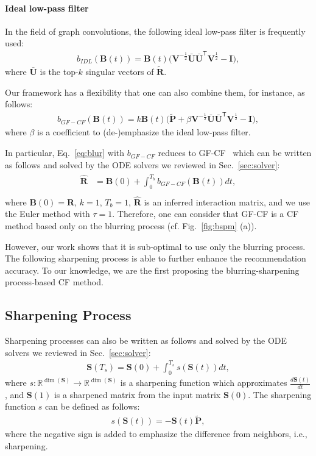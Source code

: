 \documentclass[sigconf,natbib=true]{acmart}
\begin{document}
\paragraph{Ideal low-pass filter} In the field of graph convolutions, the following ideal low-pass filter is frequently used:
\begin{align}
    b_{IDL}(\bm{B}(t)) = \bm{B}(t)\big(\bm{V}^{-\frac{1}{2}} \bar{\bm{U}} \bar{\bm{U}}^{\mathsf{T}}\bm{V}^{\frac{1}{2}}-\bm{I}\big),
\end{align}where $\bar{\bm{U}}$ is the top-$k$ singular vectors of $\tilde{\bm{R}}$.

Our framework has a flexibility that one can also combine them, for instance, as follows:
\begin{align}\label{eq:gfcf}
    b_{GF-CF}(\bm{B}(t)) = k\bm{B}(t)\big(\tilde{\bm{P}} +\beta \bm{V}^{-\frac{1}{2}} \bar{\bm{U}} \bar{\bm{U}}^{\mathsf{T}} \bm{V}^{\frac{1}{2}} - \bm{I} \big),
\end{align}where $\beta$ is a coefficient to (de-)emphasize the ideal low-pass filter.

In particular, Eq.~\eqref{eq:blur} with $b_{GF-CF}$ reduces to GF-CF~\cite{Shen21GFCF} which can be written as follows and solved by the ODE solvers we reviewed in Sec.~\ref{sec:solver}:
\begin{align}\begin{split}\label{eq:gfcf2}
    \hat{\bm{R}} &= \bm{B}(0) + \int_0^{T_b} b_{GF-CF}(\bm{B}(t)) dt,\\
\end{split}\end{align}where $\bm{B}(0) = \bm{R}$, $k=1$, $T_b=1$, $\hat{\bm{R}}$ is an inferred interaction matrix, and we use the Euler method with $\tau = 1$. Therefore, one can consider that GF-CF is a CF method based only on the blurring process (cf. Fig.~\ref{fig:bspm} (a)). 

However, our work shows that it is sub-optimal to use only the blurring process. The following sharpening process is able to further enhance the recommendation accuracy. To our knowledge, we are the first proposing the blurring-sharpening process-based CF method.

\subsection{Sharpening Process}
Sharpening processes can also be written as follows and solved by the ODE solvers we reviewed in Sec.~\ref{sec:solver}:
\begin{align}\label{eq:sharp}
    \bm{S}(T_s) = \bm{S}(0) + \int_0^{T_s} s(\bm{S}(t)) dt,
\end{align}where $s:\mathbb{R}^{\dim(\bm{S})} \rightarrow \mathbb{R}^{\dim(\bm{S})}$ is a sharpening function which approximates $\frac{d\bm{S}(t)}{dt}$, and $\bm{S}(1)$ is a sharpened matrix from the input matrix $\bm{S}(0)$. The sharpening function $s$ can be defined as follows:
\begin{align}
    s(\bm{S}(t)) = -\bm{S}(t)\tilde{\bm{P}},
\end{align}where the negative sign is added to emphasize the difference from neighbors, i.e., sharpening.
\end{document}
